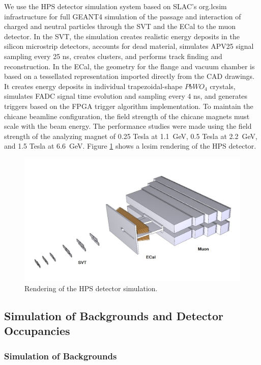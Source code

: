 We use the HPS detector simulation system based on SLAC's org.lcsim infrastructure for full GEANT4
simulation of the passage and interaction of charged and neutral particles through the SVT 
and the ECal to the muon detector. In the SVT, the simulation creates realistic energy deposits in the silicon 
microstrip detectors, accounts for dead material, simulates APV25 signal sampling every 25 ns, 
creates clusters, and performs track finding and reconstruction.
In the ECal, the geometry for the flange and vacuum chamber is based on a tessellated 
representation imported directly from the CAD drawings. It creates energy deposits in individual 
trapezoidal-shape $PbWO_4$ crystals, simulates FADC signal time evolution and sampling every 4 ns, and 
generates triggers based on the  FPGA trigger algorithm implementation.
To maintain the chicane beamline configuration, the field strength of the
chicane magnets must scale with the beam energy. The performance studies were 
made using the field strength of the 
analyzing magnet of 0.25 Tesla at 1.1~GeV, 0.5 Tesla at 2.2~GeV, and 
1.5 Tesla at 6.6~GeV.
Figure  \ref{fig:lcsim} shows a lcsim rendering of the HPS detector.

\begin{figure}[h]
\includegraphics[width=\textwidth]{performance/lcsimDetector}
\caption{\small{ Rendering of the HPS detector simulation.}}
\label{fig:lcsim}
\end{figure}

\subsection{Simulation of Backgrounds and Detector Occupancies}

\subsubsection{Simulation of Backgrounds}
\label{sec:backgrounds}

